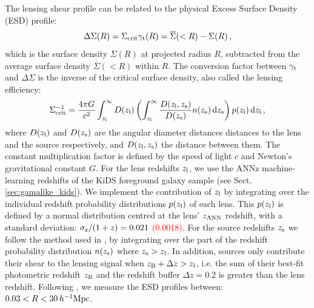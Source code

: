 \documentclass[usenatbib]{mnras}
\newcommand{\hMpc}{\, h^{-1}{\rm{Mpc}} }
\newcommand*{\mean}[1]{\overline{#1}}
\newcommand{\un}[1]{_{\rm #1}}
\begin{document}
The lensing shear profile can be related to the physical Excess Surface Density (ESD) profile:
\begin{equation}
	\Delta \Sigma (R) = \Sigma_{\rm crit} \gamma_{\rm t}(R) = \mean{\Sigma}(<R) - \Sigma(R) \, ,
	\label{eq:deltasigma}
\end{equation}
which is the surface density $\Sigma(R)$ at projected radius $R$, subtracted from the average surface density $\mean{\Sigma}(<R)$ within $R$. The conversion factor between $\gamma\un{t}$ and $\Delta\Sigma$ is the inverse of the critical surface density, also called the lensing efficiency:
\begin{equation}
	\Sigma\un{crit}^{-1} = \frac{4\pi G}{c^2} \int_{z\un{l}}^{\infty} D(z\un{l}) \left( \int_{z\un{l}}^{\infty}  \frac{D(z\un{l}, z\un{s})}{D(z\un{s})} n(z\un{s}) \, {\rm d} z\un{s} \right) p(z\un{l}) \, {\rm d} z\un{l} \, ,
	\label{eq:sigmacrit}
\end{equation}
where $D(z\un{l})$ and $D(z\un{s})$ are the angular diameter distances distances to the lens and the source respectively, and $D(z\un{l}, z\un{s})$ the distance between them. The constant multiplication factor is defined by the speed of light $c$ and Newton's gravitational constant $G$. For the lens redshifts $z\un{l}$, we use the ANNz machine-learning redshifts of the KiDS foreground galaxy sample (see Sect. \ref{sec:gamalike_kids}). We implement the contribution of $z\un{l}$ by integrating over the individual redshift probability distributions $p(z\un{l})$ of each lens. This $p(z\un{l})$ is defined by a normal distribution centred at the lens' $z\un{ANN}$ redshift, with a standard deviation: $\sigma\un{z}/(1+z) = 0.021$ \textcolor{red}{(0.0018)}. For the source redshifts $z\un{s}$ we follow the method used in \cite{dvornik2018}, by integrating over the part of the redshift probability distribution $n(z\un{s})$ where $z\un{s}>z\un{l}$. In addition, sources only contribute their shear to the lensing signal when $z\un{B}+\Delta z > z\un{l}$, i.e. the sum of their best-fit photometric redshift $z\un{B}$ and the redshift buffer $\Delta z=0.2$ is greater than the lens redshift. Following \cite{brouwer2017}, we measure the ESD profiles between: $0.03 < R < 30 \hMpc$.
\end{document}
